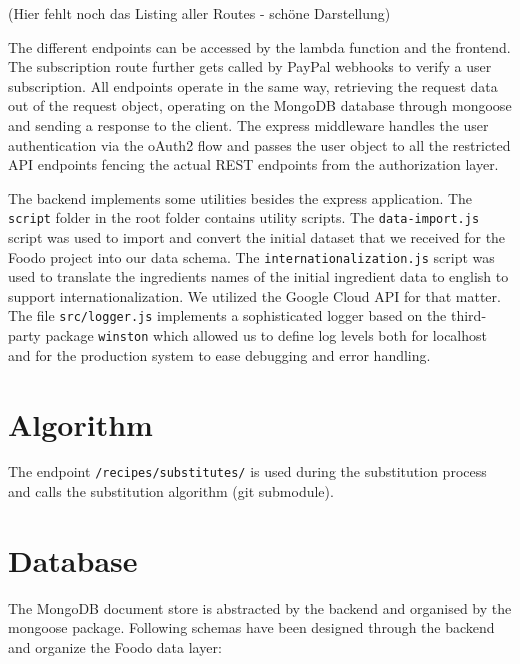 (Hier fehlt noch das Listing aller Routes - schöne Darstellung)

The different endpoints can be accessed by the lambda function and the frontend. The subscription route further gets called by PayPal webhooks to verify a user subscription. All endpoints operate in the same way, retrieving the request data out of the request object, operating on the MongoDB database through mongoose and sending a response to the client. The express middleware handles the user authentication via the oAuth2 flow and passes the user object to all the restricted API endpoints fencing the actual REST endpoints from the authorization layer. 


The backend implements some utilities besides the express application. The \texttt{script} folder in the root folder contains utility scripts. The \texttt{data-import.js} script was used to import and convert the initial dataset that we received for the Foodo project into our data schema. The \texttt{internationalization.js} script was used to translate the ingredients names of the initial ingredient data to english to support internationalization. We utilized the Google Cloud API for that matter. The file \texttt{src/logger.js} implements a sophisticated logger based on the third-party package \texttt{winston} which allowed us to define log levels both for localhost and for the production system to ease debugging and error handling. 

\section{Algorithm}
The endpoint \texttt{/recipes/substitutes/} is used during the substitution process and calls the substitution algorithm (git submodule). 

\section{Database}
The MongoDB document store is abstracted by the backend and organised by the mongoose package. Following schemas have been designed through the backend and organize the Foodo data layer: 

